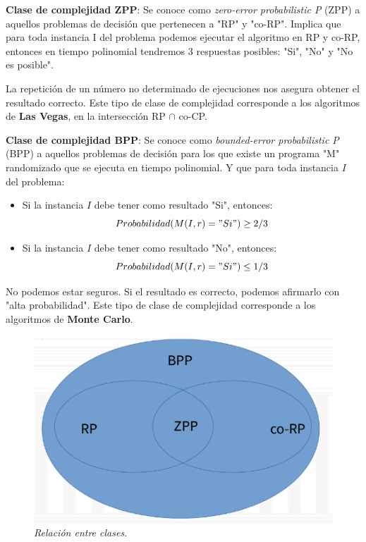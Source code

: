 \documentclass{article}
\begin{document}
\textbf{Clase de complejidad ZPP}: Se conoce como \textit{zero-error probabilistic P} (ZPP) a aquellos
problemas de decisión que pertenecen a "RP" y "co-RP". Implica que para toda instancia I del problema
podemos ejecutar el algoritmo en RP y co-RP, entonces en tiempo polinomial tendremos 3 respuestas posibles:
"Si", "No" y "No es posible".

La repetición de un número no determinado de ejecuciones nos asegura obtener el resultado correcto.
Este tipo de clase de complejidad corresponde a los algoritmos de \textbf{Las Vegas}, en la intersección RP \(\cap\) co-CP.


\textbf{Clase de complejidad BPP}: Se conoce como \textit{bounded-error probabilistic P} (BPP) a aquellos problemas de decisión
para los que existe un programa "M" randomizado que se ejecuta en tiempo polinomial. Y que para 
toda instancia \(I\) del problema:
\begin{itemize}
    \item Si la instancia \(I\) debe tener como resultado "Si", entonces:
     \[
         Probabilidad(M(I,r)="Si") \geq 2/3
     \] 
    \item Si la instancia \(I\) debe tener como resultado "No", entonces:
    \[
        Probabilidad(M(I,r)="Si") \leq 1/3
    \]
\end{itemize}

No podemos estar seguros. Si el resultado es correcto, podemos afirmarlo con "alta probabilidad".
Este tipo de clase de complejidad corresponde a los algoritmos de \textbf{Monte Carlo}.

\begin{figure}[h!]
    \begin{center} 
    \includegraphics[scale=0.3]{imagenes/relacion-rp-p-zpp-bpp.png}
    \caption{\small \sl Relación entre clases.\label{fig:hamilton-ej}} 
    \end{center}
\end{figure}
\end{document}
